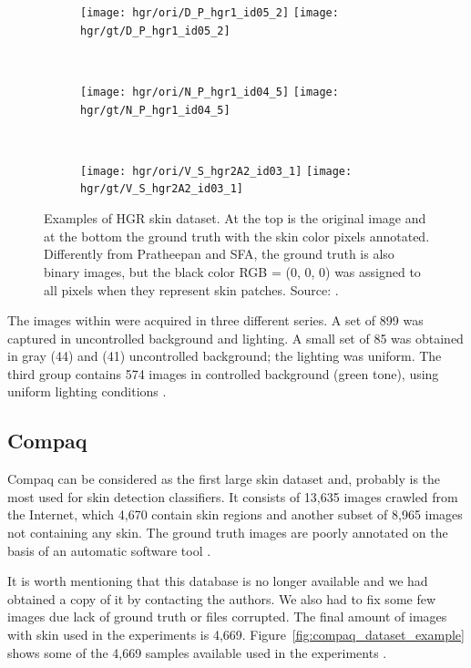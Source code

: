 \begin{figure}[H]
    \centering
    \begin{subfigure}[t]{0.3\textwidth}
        \texttt{[image: hgr/ori/D\_P\_hgr1\_id05\_2]}
        \texttt{[image: hgr/gt/D\_P\_hgr1\_id05\_2]}
    \end{subfigure}
    ~
    \begin{subfigure}[t]{0.275\textwidth}
        \texttt{[image: hgr/ori/N\_P\_hgr1\_id04\_5]}
        \texttt{[image: hgr/gt/N\_P\_hgr1\_id04\_5]}
    \end{subfigure}
    ~
    \begin{subfigure}[t]{0.337\textwidth}
        \texttt{[image: hgr/ori/V\_S\_hgr2A2\_id03\_1]}
        \texttt{[image: hgr/gt/V\_S\_hgr2A2\_id03\_1]}
    \end{subfigure}
    \caption[Examples of HGR skin dataset]{Examples of HGR skin dataset. At the top is the original image and at the bottom the ground truth with the skin color pixels annotated. Differently from Pratheepan and SFA, the ground truth is also binary images, but the black color RGB = (0, 0, 0) was assigned to all pixels when they represent skin patches. Source: \citet{kawulok:14, nalepa:14, grzejszczak:16}.}
    \label{fig:hgr_dataset_exemplo}
\end{figure}

The images within were acquired in three different series. A set of 899 was captured in uncontrolled background and lighting. A small set of 85 was obtained in gray (44) and (41) uncontrolled background; the lighting was uniform. The third group contains 574 images in controlled background (green tone), using uniform lighting conditions \citep{kawulok:14, nalepa:14, grzejszczak:16}.


\subsection{Compaq}
\label{sec:datasets_compaq}
Compaq can be considered as the first large skin dataset and, probably is the most used for skin detection classifiers. It consists of 13,635 images crawled from the Internet, which 4,670 contain skin regions and another subset of 8,965 images not containing any skin. The ground truth images are poorly annotated on the basis of an automatic software tool \citep{mahmoodi:16}.

It is worth mentioning that this database is no longer available and we had obtained a copy of it by contacting the authors. We also had to fix some few images due lack of ground truth or files corrupted. The final amount of images with skin used in the experiments is 4,669. Figure~\ref{fig:compaq_dataset_example} shows some of the 4,669 samples available used in the experiments \citep{jones:02}.

